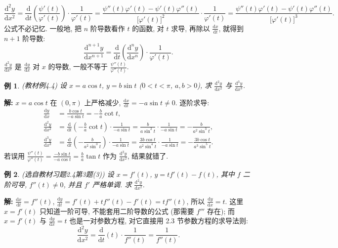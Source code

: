 \documentclass[UTF8,openany]{ctexbook}
\theoremstyle{chinesetextbook}
\newtheorem{example}{例}[section]
\newenvironment{cnsolution}{\par\indent\textbf{解:} \ignorespaces}{\par}
\newcommand{\dd}{\mathrm d}
\begin{document}
\[
\frac{\dd^2y}{\dd x^2}=\frac{\dd}{\dd t}\left(\frac{\psi'(t)}{\varphi'(t)}\right)\cdot\frac1{\varphi'(t)}=\frac{\psi''(t)\varphi'(t)-\psi'(t)\varphi''(t)}{\bigl[\varphi'(t)\bigr]^2}\cdot\frac1{\varphi'(t)}=\frac{\psi''(t)\varphi'(t)-\psi'(t)\varphi''(t)}{\bigl[\varphi'(t)\bigr]^3}.
\]
公式不必记忆. 一般地, 把 $n$ 阶导数看作 $t$ 的函数, 对 $t$ 求导, 再除以 $\displaystyle\frac{\dd x}{\dd t}$, 就得到 $n+1$ 阶导数:
\[
\frac{\dd^{n+1}y}{\dd x^{n+1}}=\frac{\dd}{\dd t}\left(\frac{\dd^ny}{\dd x^n}\right)\cdot\frac1{\varphi'(t)}.
\]
$\displaystyle\frac{\dd^2y}{\dd x^2}$ 是 $\displaystyle\frac{\dd y}{\dd x}$ 对 $x$ 的导数, 一般不等于 $\displaystyle\frac{\psi''(t)}{\varphi''(t)}$.
\begin{example}\label{ex:c2-4-4}
\textnormal{(教材例4.4)} 设 $x=a\cos t$, $y=b\sin t$ ($0<t<\pi$, $a,b>0$), 求 $\displaystyle\frac{\dd^2y}{\dd x^2}$ 与 $\displaystyle\frac{\dd^3y}{\dd x^3}$.
\end{example}
\begin{cnsolution}
$x=a\cos t$ 在 $(0,\pi)$ 上严格减少, $\displaystyle\frac{\dd x}{\dd t}=-a\sin t\ne0$. 逐阶求导:
\[
\begin{aligned}
\frac{\dd y}{\dd x}&=\frac{b\cos t}{-a\sin t}=-\frac ba\cot t,\\
\frac{\dd^2y}{\dd x^2}&=\frac{\dd}{\dd t}\left(-\frac ba\cot t\right)\cdot\frac1{-a\sin t}=\frac b{a\sin^2t}\cdot\frac1{-a\sin t}=-\frac b{a^2\sin^3t},\\
\frac{\dd^3y}{\dd x^3}&=\frac{\dd}{\dd t}\left(-\frac b{a^2\sin^3t}\right)\cdot\frac1{-a\sin t}=\frac{3b\cos t}{a^2\sin^4t}\cdot\frac1{-a\sin t}=-\frac{3b\cos t}{a^3\sin^5t}.
\end{aligned}
\]
若误用 $\displaystyle\frac{\psi''(t)}{\varphi''(t)}=\frac{-b\sin t}{-a\cos t}=\frac ba\tan t$ 作为 $\displaystyle\frac{\dd^2y}{\dd x^2}$, 结果就错了.
\end{cnsolution}
\begin{example}\label{ex:c2-h4-3}
\textnormal{(选自教材习题2.4第3题(3))} 设 $x=f'(t)$, $y=tf'(t)-f(t)$, 其中 $f$ 二阶可导, $f''(t)\ne0$, 并且 $f'$ 严格单调. 求 $\displaystyle\frac{\dd^2y}{\dd x^2}$.
\end{example}
\begin{cnsolution}
$\displaystyle\frac{\dd x}{\dd t}=f''(t)$, $\displaystyle\frac{\dd y}{\dd t}=f'(t)+tf''(t)-f'(t)=tf''(t)$, 所以 $\displaystyle\frac{\dd y}{\dd x}=t$. 这里 $x=f'(t)$ 只知道一阶可导, 不能套用二阶导数的公式 (那需要 $f'''$ 存在); 而 $x=f'(t)$ 与 $\displaystyle\frac{\dd y}{\dd x}=t$ 也是一对参数方程, 对它直接用 2.3 节参数方程的求导法则:
\[
\frac{\dd^2y}{\dd x^2}=\frac{\dd}{\dd t}(t)\cdot\frac1{f''(t)}=\frac1{f''(t)}.
\]
\end{cnsolution}
\end{document}
